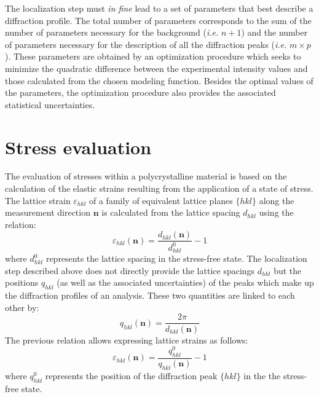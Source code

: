 \documentclass[french,a4paper]{report}
\begin{document}
The localization step must \textit{in fine} lead to a set of parameters that best describe a diffraction profile. The total number of parameters corresponds to the sum of the number of parameters necessary for the background (\textit{i.e.} $n+1$) and the number of parameters necessary for the description of all the diffraction peaks (\textit{i.e.} $m \times p$). These parameters are obtained by an optimization procedure which seeks to minimize the quadratic difference between the experimental intensity values and those calculated from the chosen modeling function. Besides the optimal values of the parameters, the optimization procedure also provides the associated statistical uncertainties.

\section{Stress evaluation}

The evaluation of stresses within a polycrystalline material is based on the calculation of the elastic strains resulting from the application of a state of stress. The lattice strain $\varepsilon_{hkl}$ of a family of equivalent lattice planes $\{hkl\}$ along the measurement direction $\boldsymbol n$ is calculated from the lattice spacing $d_{hkl} $ using the relation:
\begin{equation}
\varepsilon_{hkl} (\boldsymbol n) = \frac{d_{hkl}(\boldsymbol n)}{d^0_{hkl}}-1
\end{equation}
where $d^0_{hkl}$ represents the lattice spacing in the stress-free state. The localization step described above does not directly provide the lattice spacings $d_{hkl}$ but the positions $q_{hkl}$ (as well as the associated uncertainties) of the peaks which make up the diffraction profiles of an analysis. These two quantities are linked to each other by:
\begin{equation}
q_{hkl} (\boldsymbol n) = \frac{2 \pi}{d_{hkl}(\boldsymbol n)}
\end{equation}
The previous relation allows expressing lattice strains as follows:
\begin{equation}
\varepsilon_{hkl} (\boldsymbol n) = \frac{q^0_{hkl}}{q_{hkl}(\boldsymbol n)}-1
\label{eq_strain_q}
\end{equation}
where $q^0_{hkl}$ represents the position of the diffraction peak $\{hkl\}$ in the the stress-free state.
\end{document}
